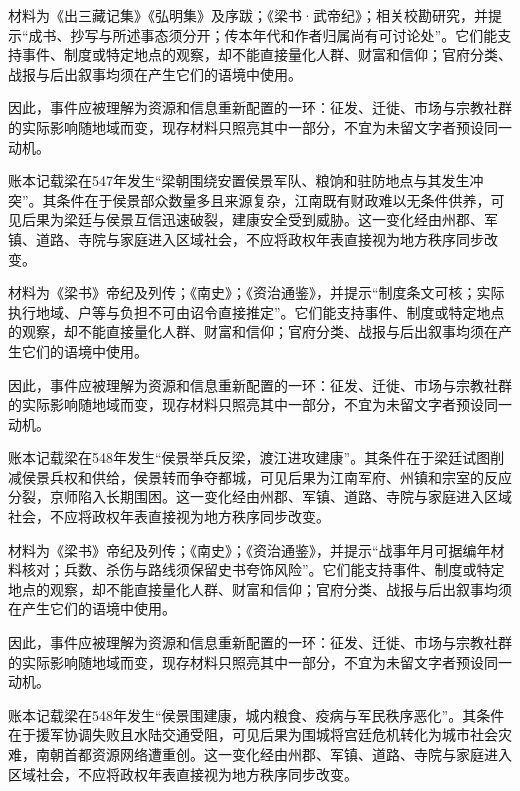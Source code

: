 材料为《出三藏记集》《弘明集》及序跋；《梁书·武帝纪》；相关校勘研究，并提示“成书、抄写与所述事态须分开；传本年代和作者归属尚有可讨论处”。它们能支持事件、制度或特定地点的观察，却不能直接量化人群、财富和信仰；官府分类、战报与后出叙事均须在产生它们的语境中使用。

因此，事件应被理解为资源和信息重新配置的一环：征发、迁徙、市场与宗教社群的实际影响随地域而变，现存材料只照亮其中一部分，不宜为未留文字者预设同一动机。

账本记载梁在547年发生“梁朝围绕安置侯景军队、粮饷和驻防地点与其发生冲突”。其条件在于侯景部众数量多且来源复杂，江南既有财政难以无条件供养，可见后果为梁廷与侯景互信迅速破裂，建康安全受到威胁。这一变化经由州郡、军镇、道路、寺院与家庭进入区域社会，不应将政权年表直接视为地方秩序同步改变。

材料为《梁书》帝纪及列传；《南史》；《资治通鉴》，并提示“制度条文可核；实际执行地域、户等与负担不可由诏令直接推定”。它们能支持事件、制度或特定地点的观察，却不能直接量化人群、财富和信仰；官府分类、战报与后出叙事均须在产生它们的语境中使用。

因此，事件应被理解为资源和信息重新配置的一环：征发、迁徙、市场与宗教社群的实际影响随地域而变，现存材料只照亮其中一部分，不宜为未留文字者预设同一动机。

账本记载梁在548年发生“侯景举兵反梁，渡江进攻建康”。其条件在于梁廷试图削减侯景兵权和供给，侯景转而争夺都城，可见后果为江南军府、州镇和宗室的反应分裂，京师陷入长期围困。这一变化经由州郡、军镇、道路、寺院与家庭进入区域社会，不应将政权年表直接视为地方秩序同步改变。

材料为《梁书》帝纪及列传；《南史》；《资治通鉴》，并提示“战事年月可据编年材料核对；兵数、杀伤与路线须保留史书夸饰风险”。它们能支持事件、制度或特定地点的观察，却不能直接量化人群、财富和信仰；官府分类、战报与后出叙事均须在产生它们的语境中使用。

因此，事件应被理解为资源和信息重新配置的一环：征发、迁徙、市场与宗教社群的实际影响随地域而变，现存材料只照亮其中一部分，不宜为未留文字者预设同一动机。

账本记载梁在548年发生“侯景围建康，城内粮食、疫病与军民秩序恶化”。其条件在于援军协调失败且水陆交通受阻，可见后果为围城将宫廷危机转化为城市社会灾难，南朝首都资源网络遭重创。这一变化经由州郡、军镇、道路、寺院与家庭进入区域社会，不应将政权年表直接视为地方秩序同步改变。

